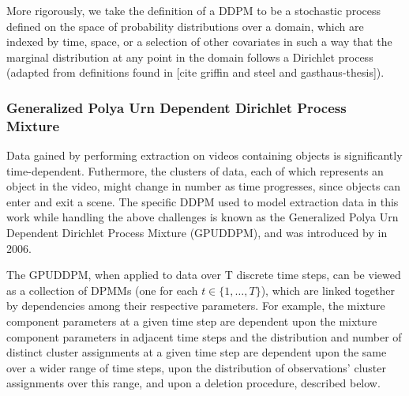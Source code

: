 \documentclass{article}
\begin{document}
More rigorously, we take the definition of a DDPM to be a stochastic process defined on the space of probability distributions over a domain, which are indexed by time, space, or a selection of other covariates in such a way that the marginal distribution at any point in the domain follows a Dirichlet process (adapted from definitions found in [cite griffin and steel and gasthaus-thesis]).



\subsubsection{Generalized Polya Urn Dependent Dirichlet Process Mixture}
\label{sec:gpudpm}

Data gained by performing extraction on videos containing objects is significantly time-dependent. Futhermore, the clusters of data, each of which represents an object in the video, might change in number as time progresses, since objects can enter and exit a scene. The specific DDPM used to model extraction data in this work while handling the above challenges is known as the Generalized Polya Urn Dependent Dirichlet Process Mixture (GPUDDPM), and was introduced by \cite{caron_2006} in 2006. 

The GPUDDPM, when applied to data over T discrete time steps, can be viewed as a collection of DPMMs (one for each $t \in \{1, \ldots, T \}$), which are linked together by dependencies among their respective parameters. For example, the mixture component parameters at a given time step are dependent upon the mixture component parameters in adjacent time steps and the distribution and number of distinct cluster assignments at a given time step are dependent upon the same over a wider range of time steps, upon the distribution of observations' cluster assignments over this range, and upon a deletion procedure, described below.
\end{document}
